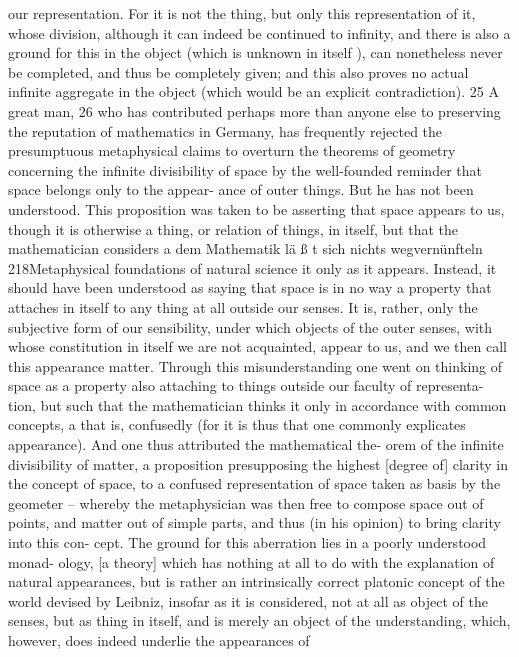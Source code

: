 our representation. For it is not the thing, but only this representation
of it, whose division, although it can indeed be continued to inﬁnity, and
there is also a ground for this in the object (which is unknown in itself ),
can nonetheless never be completed, and thus be completely given; and
this also proves no actual inﬁnite aggregate in the object (which would be
an explicit contradiction). 25 A great man, 26 who has contributed perhaps
more than anyone else to preserving the reputation of mathematics in
Germany, has frequently rejected the presumptuous metaphysical claims
to overturn the theorems of geometry concerning the inﬁnite divisibility
of space by the well-founded reminder that space belongs only to the appear-
ance of outer things. But he has not been understood. This proposition was
taken to be asserting that space appears to us, though it is otherwise a
thing, or relation of things, in itself, but that the mathematician considers
a
dem Mathematik lä ß t sich nichts wegvernünfteln
218Metaphysical foundations of natural science
it only as it appears. Instead, it should have been understood as saying
that space is in no way a property that attaches in itself to any thing at all
outside our senses. It is, rather, only the subjective form of our sensibility,
under which objects of the outer senses, with whose constitution in itself
we are not acquainted, appear to us, and we then call this appearance
matter. Through this misunderstanding one went on thinking of space
as a property also attaching to things outside our faculty of representa-
tion, but such that the mathematician thinks it only in accordance with
common concepts, a that is, confusedly (for it is thus that one commonly
explicates appearance). And one thus attributed the mathematical the-
orem of the inﬁnite divisibility of matter, a proposition presupposing
the highest [degree of] clarity in the concept of space, to a confused
representation of space taken as basis by the geometer – whereby the
metaphysician was then free to compose space out of points, and matter
out of simple parts, and thus (in his opinion) to bring clarity into this con-
cept. The ground for this aberration lies in a poorly understood monad-
ology, [a theory] which has nothing at all to do with the explanation of
natural appearances, but is rather an intrinsically correct platonic concept
of the world devised by Leibniz, insofar as it is considered, not at all as
object of the senses, but as thing in itself, and is merely an object of the
understanding, which, however, does indeed underlie the appearances of
